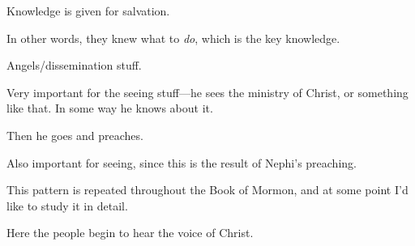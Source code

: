 \begin{compactdesc}
\begin{compactitem}
				\end{compactitem}
			\item[{\hyperref[3NEPHI-1-24]{3 Nephi 1:24--25}}]
			\item[{\hyperref[3NEPHI-1-29]{3 Nephi 1:29--30}}]
			\item[{\hyperref[3NEPHI-2-1]{3 Nephi 2:1--3}}]
			\item[{\hyperref[3NEPHI-3-19]{3 Nephi 3:19}}]
			\item[{\hyperref[3NEPHI-5-20]{3 Nephi 5:20}}] \phantom{.}
				\begin{compactitem}
					\item Knowledge is given for salvation.
				\end{compactitem}
			\item[{\hyperref[3NEPHI-6-18]{3 Nephi 6:18}}] \phantom{.}
				\begin{compactitem}
					\item In other words, they knew what to \textit{do}, which is the key knowledge.
				\end{compactitem}
			\item[{\hyperref[3NEPHI-6-20]{3 Nephi 6:20}}] \phantom{.}
				\begin{compactitem}
					\item Angels/dissemination stuff.
				\end{compactitem}
			\item[{\hyperref[3NEPHI-7-15]{3 Nephi 7:15--16}}] \phantom{.}
				\begin{compactitem}
					\item Very important for the seeing stuff---he sees the ministry of Christ, or something like that. In some way he knows about it.
					\item Then he goes and preaches.
				\end{compactitem}
			\item[{\hyperref[3NEPHI-7-18]{3 Nephi 7:18--22}}] \phantom{.}
				\begin{compactitem}
					\item Also important for seeing, since this is the result of Nephi's preaching.
					\item This pattern is repeated throughout the Book of Mormon, and at some point I'd like to study it in detail.
				\end{compactitem}
			\item[{\hyperref[3NEPHI-9-1]{3 Nephi 9:1}}] \phantom{.}
				\begin{compactitem}
					\item Here the people begin to hear the voice of Christ.

\end{compactitem}
\end{compactdesc}
